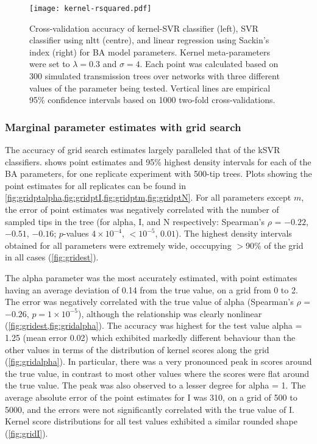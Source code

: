 \begin{figure}[ht]
  \centering
  \texttt{[image: kernel-rsquared.pdf]}
  \caption[Cross-validation accuracy of kernel-SVR, nLTT-based SVR, and
  Sackin's index regression classifiers for BA model parameters.]{
      Cross-validation accuracy of kernel-SVR classifier (left), SVR classifier
      using \gls{nltt} (centre), and linear regression using Sackin's index
      (right) for \gls{BA} model parameters. Kernel meta-parameters were set to
      $\lambda = 0.3$ and $\sigma = 4$. Each point was calculated based on 300
      simulated transmission trees over networks with three different values of
      the parameter being tested. Vertical lines are empirical 95\% confidence
      intervals based on 1000 two-fold cross-validations.
  }
  \label{fig:rsquared}
\end{figure}

\subsubsection*{Marginal parameter estimates with grid search}



The accuracy of grid search estimates largely paralleled that of the \gls{kSVR}
classifiers.  shows point estimates and 95\% highest density
intervals for each of the \gls{BA} parameters, for one replicate experiment
with 500-tip trees. Plots showing the point estimates for all replicates can be
found in \cref{fig:gridptalpha,fig:gridptI,fig:gridptm,fig:gridptN}. For all
parameters except $m$, the error of point estimates was negatively correlated
with the number of sampled tips in the tree (for
\gls{alpha}, \gls{I}, and \gls{N} respectively: Spearman's $\rho$ = 
    \ensuremath{-0.22},
    \ensuremath{-0.51},
    \ensuremath{-0.16};
$p$-values
    $4\!\times\!10^{-4}$,
    ${<}10^{-5}$,
    $0.01$).
The highest density intervals obtained for all parameters were extremely wide,
occcupying $>$90\% of the grid in all cases (\cref{fig:gridest}).

The \gls{alpha} parameter was the most accurately estimated, with point
estimates having an average deviation of 
    0.14
from the true value, on a grid from 0 to 2. The error was negatively correlated
with the true value of \gls{alpha} 
    (Spearman's $\rho$ = \ensuremath{-0.26},
     $p = 1\!\times\!10^{-5}$),
although the relationship was clearly nonlinear (\cref{fig:gridest,fig:gridalpha}).
The accuracy was highest for the test value \gls{alpha} = 1.25
    (mean error 0.02)
which exhibited markedly different behaviour than the other values in terms of
the distribution of kernel scores along the grid (\cref{fig:gridalpha}). In
particular, there was a very pronounced peak in scores around the true value,
in contrast to most other values where the scores were flat around the true
value. The peak was also observed to a lesser degree for \gls{alpha} = 1. The
average absolute error of the point estimates for \gls{I} was 
    310,
on a grid of 500 to 5000, and the errors were not significantly correlated with
the true value of \gls{I}. Kernel score distributions for all test values
exhibited a similar rounded shape (\cref{fig:gridI}). 

